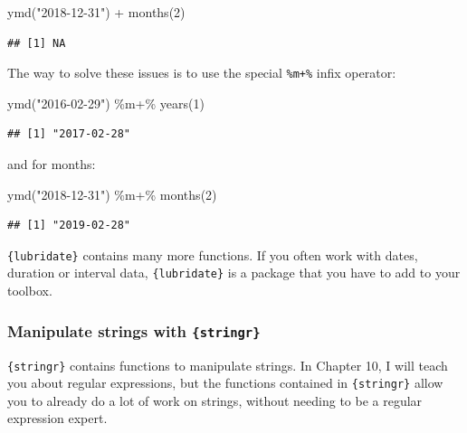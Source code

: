 \documentclass[
]{article}
\newenvironment{Shaded}{\begin{snugshade}}{\end{snugshade}}
\newcommand{\DecValTok}[1]{\textcolor[rgb]{0.00,0.00,0.81}{#1}}
\newcommand{\FunctionTok}[1]{\textcolor[rgb]{0.00,0.00,0.00}{#1}}
\newcommand{\NormalTok}[1]{#1}
\newcommand{\SpecialCharTok}[1]{\textcolor[rgb]{0.00,0.00,0.00}{#1}}
\newcommand{\StringTok}[1]{\textcolor[rgb]{0.31,0.60,0.02}{#1}}
\begin{document}
\begin{Shaded}
\begin{Highlighting}[]
\FunctionTok{ymd}\NormalTok{(}\StringTok{"2018{-}12{-}31"}\NormalTok{) }\SpecialCharTok{+} \FunctionTok{months}\NormalTok{(}\DecValTok{2}\NormalTok{)}
\end{Highlighting}
\end{Shaded}

\begin{verbatim}
## [1] NA
\end{verbatim}

The way to solve these issues is to use the special \texttt{\%m+\%} infix operator:

\begin{Shaded}
\begin{Highlighting}[]
\FunctionTok{ymd}\NormalTok{(}\StringTok{"2016{-}02{-}29"}\NormalTok{) }\SpecialCharTok{\%m+\%} \FunctionTok{years}\NormalTok{(}\DecValTok{1}\NormalTok{)}
\end{Highlighting}
\end{Shaded}

\begin{verbatim}
## [1] "2017-02-28"
\end{verbatim}

and for months:

\begin{Shaded}
\begin{Highlighting}[]
\FunctionTok{ymd}\NormalTok{(}\StringTok{"2018{-}12{-}31"}\NormalTok{) }\SpecialCharTok{\%m+\%} \FunctionTok{months}\NormalTok{(}\DecValTok{2}\NormalTok{)}
\end{Highlighting}
\end{Shaded}

\begin{verbatim}
## [1] "2019-02-28"
\end{verbatim}

\texttt{\{lubridate\}} contains many more functions. If you often work with dates, duration or interval
data, \texttt{\{lubridate\}} is a package that you have to add to your toolbox.

\hypertarget{manipulate-strings-with-stringr}{%
\subsubsection{\texorpdfstring{Manipulate strings with \texttt{\{stringr\}}}{Manipulate strings with \{stringr\}}}\label{manipulate-strings-with-stringr}}

\texttt{\{stringr\}} contains functions to manipulate strings. In Chapter 10, I will teach you about regular
expressions, but the functions contained in \texttt{\{stringr\}} allow you to already do a lot of work on
strings, without needing to be a regular expression expert.
\end{document}
